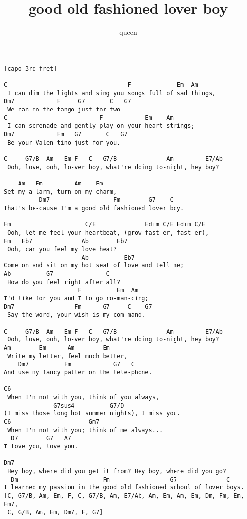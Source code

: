 \author{queen}
\title{good old fashioned lover boy}
\maketitle
\begin{verbatim}
[capo 3rd fret]

C                                  F             Em  Am
 I can dim the lights and sing you songs full of sad things,
Dm7            F     G7       C   G7
 We can do the tango just for two.
C                          F            Em    Am
 I can serenade and gently play on your heart strings;
Dm7            Fm   G7       C   G7
 Be your Valen-tino just for you.

C     G7/B  Am   Em F   C   G7/B              Am         E7/Ab
 Ooh, love, ooh, lo-ver boy, what're doing to-night, hey boy?

    Am   Em         Am    Em
Set my a-larm, turn on my charm,
          Dm7                  Fm        G7    C
That's be-cause I'm a good old fashioned lover boy.

Fm                     C/E              Edim C/E Edim C/E
 Ooh, let me feel your heartbeat, (grow fast-er, fast-er),
Fm   Eb7              Ab        Eb7
 Ooh, can you feel my love heat?
                      Ab          Eb7
Come on and sit on my hot seat of love and tell me;
Ab          G7               C
 How do you feel right after all?
                     F          Em  Am
I'd like for you and I to go ro-man-cing;
Dm7                 Fm      G7     C    G7
 Say the word, your wish is my com-mand.

C     G7/B  Am   Em F   C   G7/B              Am         E7/Ab
 Ooh, love, ooh, lo-ver boy, what're doing to-night, hey boy?
Am        Em      Am        Em
 Write my letter, feel much better,
    Dm7          Fm            G7   C
And use my fancy patter on the tele-phone.

C6
 When I'm not with you, think of you always,
              G7sus4          G7/D
(I miss those long hot summer nights), I miss you.
C6                      Gm7
 When I'm not with you; think of me always...
  D7        G7   A7
I love you, love you.

Dm7
 Hey boy, where did you get it from? Hey boy, where did you go?
  Dm                        Fm                 G7              C
I learned my passion in the good old fashioned school of lover boys.
[C, G7/B, Am, Em, F, C, G7/B, Am, E7/Ab, Am, Em, Am, Em, Dm, Fm, Em, Fm7,
 C, G/B, Am, Em, Dm7, F, G7]


\end{verbatim}
